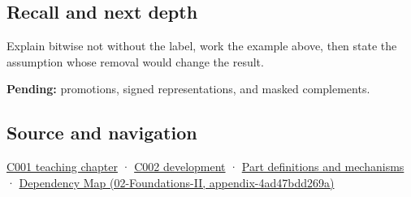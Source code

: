 \subsection{Recall and next depth}\label{recall-and-next-depth}

Explain bitwise not without the label, work the example above, then state the assumption whose removal would change the result.

\textbf{Pending:} promotions, signed representations, and masked complements.

\subsection{Source and navigation}\label{source-and-navigation}

\href{Continuous\%20Notes/Computing\%20Foundations\%20-\%20From\%20Bits\%20to\%20C++\%20and\%20Systems\%20APIs\#From\%20a\%20signal\%20to\%20an\%20interpretation}{C001 teaching chapter} · \href{Continuous\%20Notes/Computing\%20Foundations\%20-\%20From\%20Bits\%20to\%20C++\%20and\%20Systems\%20APIs\#Arithmetic\%20becomes\%20a\%20policy}{C002 development} · \hyperref[appendix-fd090d982a15]{Part definitions and mechanisms} · \href{}{Dependency Map (02-Foundations-II, appendix-4ad47bdd269a)}
